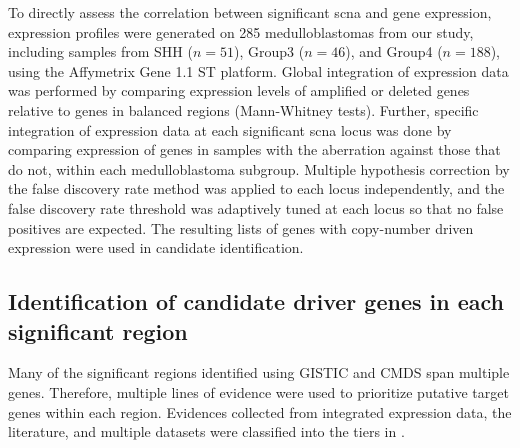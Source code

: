 To directly assess the correlation between significant \gls{scna} and gene expression, expression profiles were generated on 285 medulloblastomas from our study, including samples from SHH ($n = 51$), Group3 ($n = 46$), and Group4 ($n = 188$), using the Affymetrix Gene 1.1 ST platform. Global integration of expression data was performed by comparing expression levels of amplified or deleted genes relative to genes in balanced regions (Mann-Whitney tests). Further, specific integration of expression data at each significant \gls{scna} locus was done by comparing expression of genes in samples with the aberration against those that do not, within each medulloblastoma subgroup. Multiple hypothesis correction by the false discovery rate method was applied to each locus independently, and the false discovery rate threshold was adaptively tuned at each locus so that no false positives are expected. The resulting lists of genes with copy-number driven expression were used in candidate identification.

\subsection{Identification of candidate driver genes in each significant region}

Many of the significant regions identified using GISTIC and CMDS span multiple genes. Therefore, multiple lines of evidence were used to prioritize putative target genes within each region. Evidences collected from integrated expression data, the literature, and multiple datasets were classified into the tiers in .


